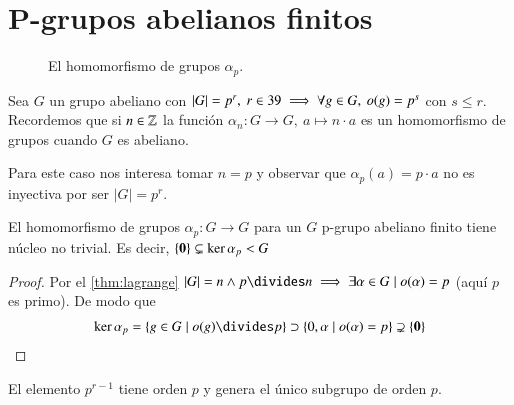 \section{P-grupos abelianos finitos}

\begin{wrapfigure}{l}{0.4\textwidth}
	\caption{El homomorfismo de grupos $\alpha_p$.}
	\label{fig:homomorfismoalphap}
\end{wrapfigure}

Sea $G$ un grupo abeliano con $|G| = p^r,\ r \in 39 \implies \forall g \in G,\ o(g) = p^s$ con $s \leq r$. Recordemos que si $n \in \mathbb{Z}$ la función $\alpha_n :G \to G,\ a \mapsto n\cdot a$ es un homomorfismo de grupos cuando $G$ es abeliano.

Para este caso nos interesa tomar $n = p$ y observar que $\alpha_p(a) = p\cdot a$ no es inyectiva por ser $|G| = p^r$.


\begin{pro}
	El homomorfismo de grupos $\alpha_p:G \to G$ para un $G$ p-grupo abeliano finito tiene núcleo no trivial. Es decir, $\{\mathbf{0}\} \subsetneq \ker \alpha_p < G$
\end{pro}

\begin{proof}
	 Por el \autoref{thm:lagrange} $|G| = n \land p \divides n \implies \exists \alpha \in G \mid o(\alpha) = p$ (aquí $p$ es primo). De modo que 
	 \begin{align*}
	 	\ker \alpha_p = \{g \in G \mid o(g) \divides p \} \supset \{0, \alpha \mid o(\alpha) = p\} \supsetneq \{\0\}
	 \end{align*}
\end{proof}

\begin{obs}El elemento $p^{r-1}$ tiene orden $p$ y genera el único subgrupo de orden $p$.
\end{obs}

